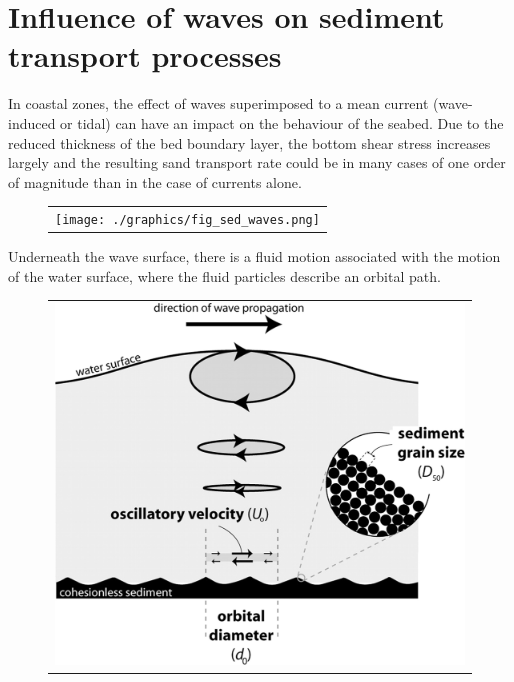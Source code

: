 \section{Influence of waves on sediment transport processes}
\label{chap:infl_waves}
In coastal zones, the effect of waves superimposed to a mean current (wave-induced or tidal) can have an impact on the behaviour of the seabed. Due to the reduced thickness of the bed boundary layer, the bottom shear stress increases largely and the resulting sand transport rate could be in many cases of one order of magnitude than in the case of currents alone.

\begin{figure}[H]%
  \begin{center}
\begin{tabular}{c}
\texttt{[image: ./graphics/fig\_sed\_waves.png]}
\end{tabular}
\end{center}
\end{figure}

Underneath the wave surface, there is a fluid motion associated with the motion of the water surface, where the fluid particles describe an orbital path.

\begin{figure}[H]%
  \begin{center}
\begin{tabular}{c}
\includegraphics[scale=0.12]{./graphics/orbital_large.jpg}
\end{tabular}
\end{center}
\end{figure}

